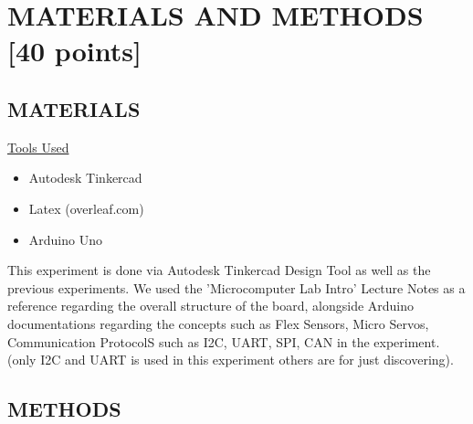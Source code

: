 \documentclass[pdftex,12pt,a4paper]{article}
\begin{document}
\section{MATERIALS AND METHODS [40 points]}
\subsection{MATERIALS}
\underline{Tools Used}\cite{booklet}
\begin{itemize}
    \item {Autodesk Tinkercad}
    \item{Latex (overleaf.com)}
    \item{Arduino Uno}
    
\end{itemize}

This experiment is done via Autodesk Tinkercad Design Tool as well as the previous experiments. We used the 'Microcomputer Lab Intro' Lecture Notes as a reference regarding the overall structure of the board, alongside Arduino documentations regarding the concepts such as Flex Sensors, Micro Servos, Communication ProtocolS such as I2C, UART, SPI, CAN in the experiment. (only I2C and UART is used in this experiment others are for just discovering).

\subsection{METHODS}
\end{document}
